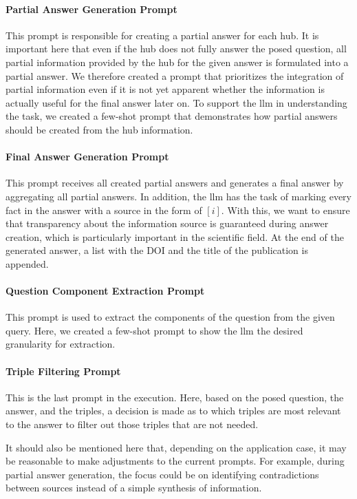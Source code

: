 \paragraph{Partial Answer Generation Prompt} This prompt is responsible for creating a partial answer for each hub. It is important here that even if the hub does not fully answer the posed question, all partial information provided by the hub for the given answer is formulated into a partial answer. We therefore created a prompt that prioritizes the integration of partial information even if it is not yet apparent whether the information is actually useful for the final answer later on. To support the \gls{llm} in understanding the task, we created a few-shot prompt that demonstrates how partial answers should be created from the hub information.

\paragraph{Final Answer Generation Prompt} This prompt receives all created partial answers and generates a final answer by aggregating all partial answers. In addition, the \gls{llm} has the task of marking every fact in the answer with a source in the form of $[i]$. With this, we want to ensure that transparency about the information source is guaranteed during answer creation, which is particularly important in the scientific field. At the end of the generated answer, a list with the DOI and the title of the publication is appended.

\paragraph{Question Component Extraction Prompt} This prompt is used to extract the components of the question from the given query. Here, we created a few-shot prompt to show the \gls{llm} the desired granularity for extraction.

\paragraph{Triple Filtering Prompt} This is the last prompt in the execution. Here, based on the posed question, the answer, and the triples, a decision is made as to which triples are most relevant to the answer to filter out those triples that are not needed.

It should also be mentioned here that, depending on the application case, it may be reasonable to make adjustments to the current prompts. For example, during partial answer generation, the focus could be on identifying contradictions between sources instead of a simple synthesis of information.